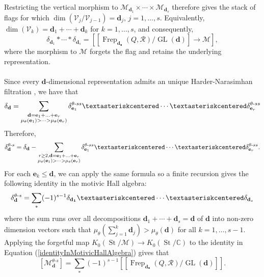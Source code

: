 \documentclass{amsart}
\theoremstyle{plain}
\numberwithin{equation}{section}
\theoremstyle{definition}
\theoremstyle{remark}
\begin{document}
	Restricting the vertical morphism to $\mathscr M_{\mathbf d_1}\times\cdots\times\mathscr M_{\mathbf d_s}$
	therefore gives the stack of flags for which
	$\dim\left(\mathcal V_j/\mathcal V_{j-1}\right)=\mathbf d_j$, $j=1,\ldots,s$.
	Equivalently,
	$\dim(\mathcal V_k)=\mathbf d_1+\cdots+\mathbf d_k$ for $k=1,\ldots,s$,
	and consequently,
	\[
	\delta_{\mathbf d_1}\ast\cdots\ast\delta_{\mathbf d_s}
	=
	\left[
	\left[
	\operatorname{Frep}_{\mathbf d_\bullet}(Q,\mathcal R)
	/
	\operatorname{GL}(\mathbf d)
	\right]
	\longrightarrow
	\mathscr M
	\right],
	\]
	where the morphism to $\mathscr M$ forgets the flag and retains the
	underlying representation.
	\\
	\\
	Since every $\mathbf{d}$-dimensional representation admits an unique Harder-Narasimhan filtration \cite[Lemma 4.7]{ReinekeSurvey}, we have that 
	$$
	\delta_{\mathbf{d}} =\sum_{\substack{\mathbf{d}=\mathbf{e}_1+\ldots+\mathbf{e}_r \\ \mu_{\theta}(\mathbf{e}_1)>\cdots> \mu_{\theta}(\mathbf{e}_r)}}\delta_{\mathbf{e}_1}^{\theta\text{-}ss}\textasteriskcentered\cdots\textasteriskcentered \delta_{\mathbf{e}_r}^{\theta\text{-}ss} 
	$$
	Therefore, 
	$$
	\delta^{\theta\text{-}s}_{\mathbf{d}}=\delta_{\mathbf{d}}-\sum_{\substack{r\geq 2,\mathbf{d}=\mathbf{e}_1+\ldots+\mathbf{e}_r \\ \mu_{\theta}(\mathbf{e}_1)>\cdots> \mu_{\theta}(\mathbf{e}_r)}}\delta_{\mathbf{e}_1}^{\theta\text{-}ss}\textasteriskcentered\cdots\textasteriskcentered \delta_{\mathbf{e}_r}^{\theta\text{-}ss}.
	$$
	For each $\mathbf{e}_k\leq \mathbf{d}$, we can apply the same formula so a finite recursion gives the following identity in the motivic Hall algebra:
	\begin{equation}\label{identityInMotivicHallAlgebra}
		\delta_{\mathbf{d}}^{\theta\text{-}s}=\sum_{*}(-1)^{s-1}\delta_{\mathbf{d_1}}\textasteriskcentered\cdots\textasteriskcentered\delta_{\mathbf{d}_s}
	\end{equation}
	where the sum runs over all decompositions $\mathbf{d}_1+\cdots+\mathbf{d}_s=\mathbf{d}$ of $\mathbf{d}$ into non-zero dimension vectors such that $\mu_{\theta}(\sum_{j=1}^k\mathbf{d}_j)>\mu_{\theta}(\mathbf{d})$ for all $k=1,\ldots,s-1$.
	Applying the forgetful map $K_0(\operatorname{St}/\mathscr{M})\to K_0(\operatorname{St}/\mathbb{C})$ to the identity in Equation (\ref{identityInMotivicHallAlgebra}) gives that 
	$$
	[\mathscr{M}^{\theta\text{-}s}_{\mathbf{d}}]=\sum_{*}(-1)^{s-1}\left[[\operatorname{Frep}_{\mathbf{d}_\bullet}(Q,\mathcal{R})/\operatorname{GL}(\mathbf{d})]\right].
	$$
\end{document}

